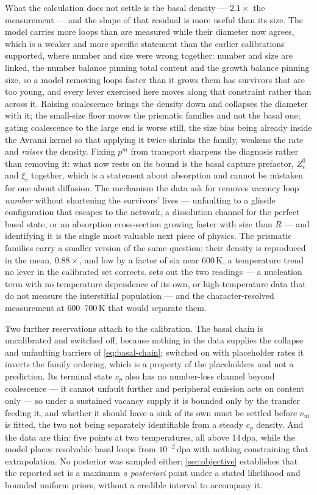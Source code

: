 What the calculation does not settle is the basal density --- $2.1\times$ the
measurement --- and the shape of that residual is more useful than its size. The
model carries more \cloop{} loops than are measured while their diameter now
agrees, which is a weaker and more specific statement than the earlier
calibrations supported, where number and size were wrong together: number and size are
linked, the number balance pinning total content and the growth balance pinning
size, so a model removing loops faster than it grows them has survivors that are
too young, and every lever exercised here moves along that constraint rather than
across it. Raising coalescence brings the density down and collapses the diameter
with it; the small-size floor moves the prismatic families and not the basal one;
gating coalescence to the large end is worse still, the size bias being already
inside the Avrami kernel so that applying it twice shrinks the family, weakens
the rate and \emph{raises} the density. Fixing $p^{m}$ from transport sharpens
the diagnosis rather than removing it: what now rests on its bound is the basal
capture prefactor, $Z^{0}_{v}$ and $\xi_{c}$ together, which is a statement about
absorption and cannot be mistaken for one about diffusion. The mechanism the data
ask for removes vacancy loop \emph{number} without shortening the survivors'
lives --- unfaulting to a glissile configuration that escapes to the network, a
dissolution channel for the perfect basal state, or an absorption cross-section
growing faster with size than $R$ --- and identifying it is the single most
valuable next piece of physics. The prismatic families carry a smaller version of
the same question: their density is reproduced in the mean, $0.88\times$, and
low by a factor of six near $600\,$K, a temperature trend no lever in the
calibrated set corrects.  sets out the two readings --- a
nucleation term with no temperature dependence of its own, or high-temperature
data that do not measure the interstitial population --- and the
character-resolved measurement at $600$--$700\,$K that would separate them.

Two further reservations attach to the calibration. The basal chain is
uncalibrated and switched off, because nothing in the data supplies the collapse
and unfaulting barriers of \cref{eq:basal-chain}; switched on with placeholder
rates it inverts the family ordering, which is a property of the placeholders and
not a prediction. Its terminal state $c_p$ also has no number-loss channel beyond
coalescence --- it cannot unfault further and peripheral emission acts on content
only --- so under a sustained vacancy supply it is bounded only by the transfer
feeding it, and whether it should have a sink of its own must be settled before
$\nu_{\mathrm{uf}}$ is fitted, the two not being separately identifiable from a
steady $c_p$ density. And the \cloop{} data are thin: five points at two
temperatures, all above 14\,dpa, while the model places resolvable basal loops
from $10^{-2}\,$dpa with nothing constraining that extrapolation. No posterior
was sampled either; \cref{sec:objective} establishes that the reported set is a
maximum \emph{a posteriori} point under a stated likelihood and bounded uniform
priors, without a credible interval to accompany it.

